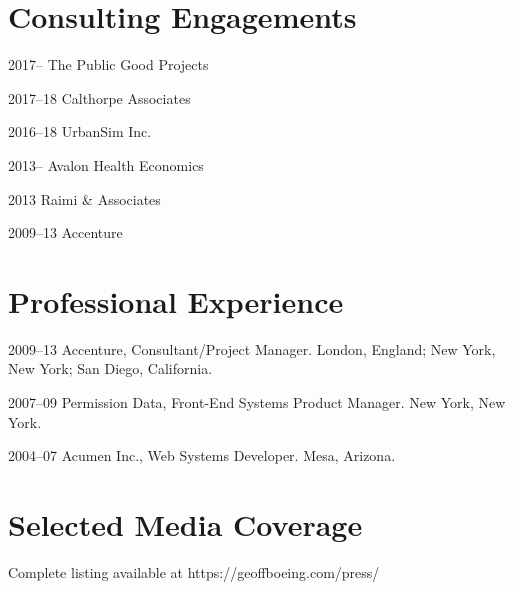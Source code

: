 \documentclass[12pt,letterpaper]{report}
\begin{document}
\section*{Consulting Engagements}

\begin{tablist}

\item[2017--]   \tab The Public Good Projects	

\item[2017--18]   \tab Calthorpe Associates

\item[2016--18]   \tab UrbanSim Inc.

\item[2013--]   \tab Avalon Health Economics

\item[2013]     \tab Raimi \& Associates

\item[2009--13] \tab Accenture

\end{tablist}



\section*{Professional Experience}

\begin{tablist}
	
\item[2009--13] \tab Accenture, Consultant/Project Manager. London, England; New York, New York; San Diego, California.

\item[2007--09] \tab Permission Data, Front-End Systems Product Manager. New York, New York.

\item[2004--07] \tab Acumen Inc., Web Systems Developer. Mesa, Arizona.

\end{tablist}



\section*{Selected Media Coverage}

Complete listing available at https://geoffboeing.com/press/ \bigskip
\end{document}
